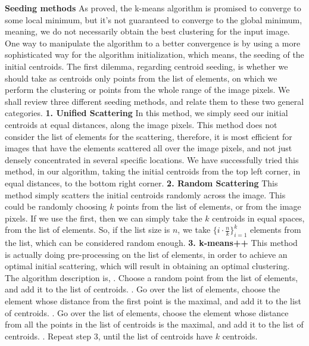\documentclass[12pt]{article}
\begin{document}
\textbf{Seeding methods} \newline
As proved, the k-means algorithm is promised to converge to some local minimum, but it's not guaranteed to converge to the global minimum, \newline
meaning, we do not necessarily obtain the best clustering for the input image. \newline
One way to manipulate the algorithm to a better convergence is by using a more sophisticated way for the algorithm initialization, which means, the seeding of the initial centroids. \newline
The first dilemma, regarding centroid seeding, is whether we should take as centroids only points from the list of elements, on which we perform the clustering or points from the whole range of the image pixels. \newline
We shall review three different seeding methods, and relate them to these two general categories.
\newpage
\textbf{1. Unified Scattering} \newline
In this method, we simply seed our initial centroids at equal distances, along the image pixels. This method does not consider the list of elements for the scattering, therefore, it is most efficient for images that have the elements scattered all over the image pixels, and not just densely concentrated in several specific locations. \newline
We have successfully tried this method, in our algorithm, taking the initial centroids from the top left corner, in equal distances, to the bottom right corner. \newline \newline
\textbf{2. Random Scattering} \newline
This method simply scatters the initial centroids randomly across the image.  This could be randomly choosing $k$ points from the list of elements, or from the image pixels. If we use the first, then we can simply take the $k$ centroids in equal spaces, from the list of elements. So, if the list size is $n$, we take $\{i \cdot \frac{n}{k}\}_{i=1}^k$ elements from the list, which can be considered random enough. \newline \newline
\textbf{3. k-means++} \newline
This method is actually doing pre-processing on the list of elements, in order to achieve an optimal initial scattering, which will result in obtaining an optimal clustering. \newline
The algorithm description is, . Choose a random point from the list of elements, and add it to the list of centroids. . Go over the list of elements, choose the element whose distance from the first point is the maximal, and add it to the list of centroids. . Go over the list of elements, choose the element whose distance from all the points in the list of centroids is the maximal, and add it to the list of centroids. . Repeat step 3, until the list of centroids have $k$ centroids. \newline
\end{document}
